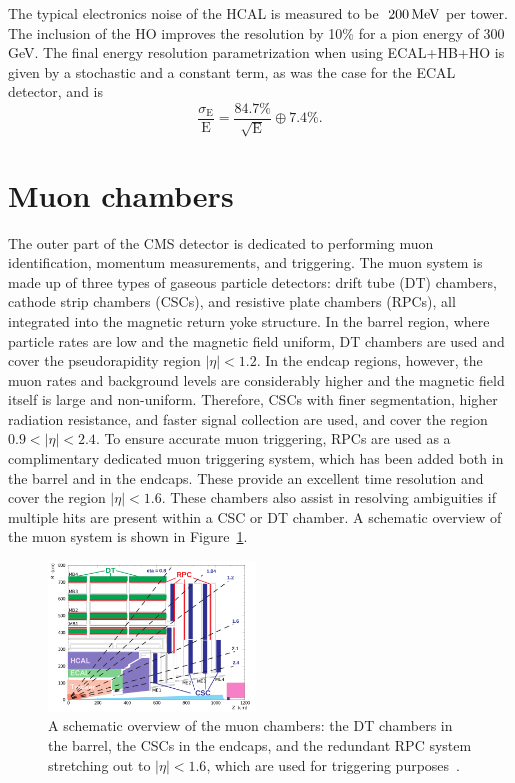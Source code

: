 The typical electronics noise of the HCAL is measured to be $~200 \,\text{Me\hspace{-.08em}V}$ per tower. The inclusion of the HO improves the resolution by 10\% for a pion energy of 300 GeV. The final energy resolution parametrization when using ECAL+HB+HO is given by a stochastic and a constant term, as was the case for the ECAL detector, and is
\begin{equation*}
  \frac{\sigma_{\textrm{E}}}{\textrm{E}} = \frac{84.7 \%}{\sqrt{\textrm{E}}}\oplus 7.4 \%.
\end{equation*}

\section{Muon chambers}
The outer part of the CMS detector is dedicated to performing muon identification, momentum measurements, and triggering.
The muon system is made up of three types of gaseous particle detectors: drift tube (DT) chambers, cathode strip chambers (CSCs), and resistive plate chambers (RPCs), all integrated into the magnetic return yoke structure.
In the barrel region, where particle rates are low and the magnetic field uniform, DT chambers are used and cover the pseudorapidity region $|\eta|< 1.2$. In the endcap regions, however, the muon rates and background levels are considerably higher and the magnetic field itself is large and non-uniform. Therefore, CSCs with finer segmentation, higher radiation resistance, and faster signal collection are used, and cover the region $0.9 < |\eta|< 2.4$.
To ensure accurate muon triggering, RPCs are used as a complimentary dedicated muon triggering system, which has been added both in the barrel and in the endcaps. These provide an excellent time resolution and cover the region $|\eta|< 1.6$. These chambers also assist in resolving ambiguities if multiple hits are present within a CSC or DT chamber. A schematic overview of the muon system is shown in Figure~\ref{fig:cms:muon-sys}.
\begin{figure}[h] 
    \centering
    \includegraphics[width=0.49\textwidth]{figures/cms/MuonSys.png}
    \caption{A schematic overview of the muon chambers: the DT chambers in the barrel, the CSCs in the endcaps, and the redundant RPC system stretching out to $|\eta|< 1.6$, which are used for triggering purposes~\cite{Kim:1477844}.}
    \label{fig:cms:muon-sys}
\end{figure}

